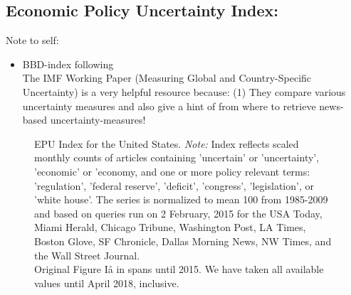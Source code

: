 \documentclass[a4paper,12pt,oneside,pointednumbers,bibtotoc,bigheadings,liststotoc]{scrbook}
\begin{document}
\subsection{Economic Policy Uncertainty Index: \citet{bakeretal:15}}
\label{sec:epuindex}

\begingroup
    \fontsize{8pt}{12pt}\selectfont
    Note to self:
\begin{itemize}
	\item  BBD-index following \citet{bakeretal:15}\\
The IMF Working Paper (Measuring Global and Country-Specific Uncertainty) is a very helpful resource because: (1) They compare various uncertainty measures and also give a hint of from where to retrieve news-based uncertainty-measures!
\end{itemize}
\endgroup


\begin{figure}[h]
   \centering
   \setlength\fboxsep{0pt}
   \setlength\fboxrule{0pt}
      \caption[EPU Index for the United States.]{EPU Index for the United States.
      \textit{Note:} Index reflects scaled monthly counts of articles containing 'uncertain' or 'uncertainty', 'economic' or 'economy, and one or more policy relevant terms: 'regulation', 'federal reserve', 'deficit', 'congress', 'legislation', or 'white house'. The series is normalized to mean 100 from 1985-2009 and based on queries run on 2 February, 2015 for the USA Today, Miami Herald, Chicago Tribune, Washington Post, LA Times, Boston Glove, SF Chronicle, Dallas Morning News, NW Times, and the Wall Street Journal.\\
      Original Figure Iå in \citet{bakeretal:15} spans until 2015. We have taken all available values until April 2018, inclusive.}   \label{fig:epuindex}
\end{figure}
\end{document}
